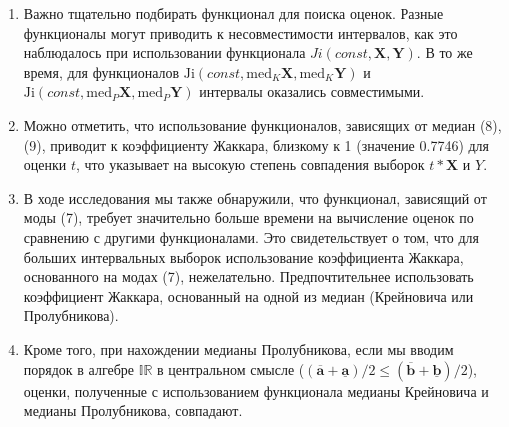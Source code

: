 \documentclass[10pt]{article}
\begin{document}
\begin{enumerate}
    \item Важно тщательно подбирать функционал для поиска оценок. Разные функционалы могут приводить к несовместимости интервалов, как это наблюдалось при использовании функционала $Ji(const,\mathbf{X},\mathbf{Y})$. В то же время, для функционалов $\text{Ji} (const, \text{med}_K \mathbf{X}, \text{med}_K \mathbf{Y})$ и $\text{Ji} (const, \text{med}_P \mathbf{X}, \text{med}_P \mathbf{Y})$ интервалы оказались совместимыми.

    \item Можно отметить, что использование функционалов, зависящих от медиан (8), (9), приводит к коэффициенту Жаккара, близкому к 1 (значение 0.7746) для оценки \( t \), что указывает на высокую степень совпадения выборок \( t*\mathbf{X} \) и \( Y \).

    \item В ходе исследования мы также обнаружили, что функционал, зависящий от моды (7), требует значительно больше времени на вычисление оценок по сравнению с другими функционалами. Это свидетельствует о том, что для больших интервальных выборок использование коэффициента Жаккара, основанного на модах (7), нежелательно. Предпочтительнее использовать коэффициент Жаккара, основанный на одной из медиан (Крейновича или Пролубникова).

    \item Кроме того, при нахождении медианы Пролубникова, если мы вводим порядок в алгебре \( \mathbb{IR} \) в центральном смысле (\( (\overline{\mathbf{a}} + \underline{\mathbf{a}}) / 2 \leq (\overline{\mathbf{b}} + \underline{\mathbf{b}}) / 2 \)), оценки, полученные с использованием функционала медианы Крейновича и медианы Пролубникова, совпадают.
\end{enumerate}
\end{document}
